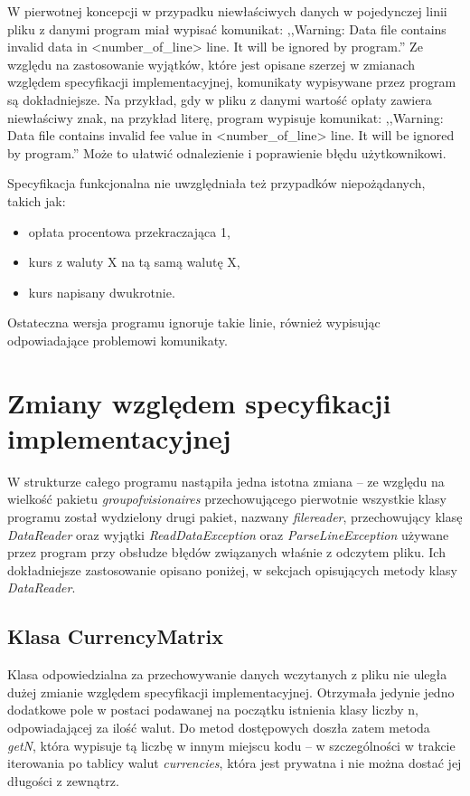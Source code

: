 \documentclass[a4paper,12pt]{article}
\newcommand\tab[1][0.6cm]{\hspace*{#1}}
\begin{document}
\tab W pierwotnej koncepcji w przypadku niewłaściwych danych w pojedynczej linii pliku z danymi program miał wypisać komunikat: ,,Warning: Data file contains invalid data in <number\_of\_line> line. It will be ignored by program.'' Ze względu na zastosowanie wyjątków, które jest opisane szerzej w zmianach względem specyfikacji implementacyjnej, komunikaty wypisywane przez program są dokładniejsze. Na przykład, gdy w pliku z danymi wartość opłaty zawiera niewłaściwy znak, na przykład literę, program wypisuje komunikat: ,,Warning: Data file contains invalid fee value in <number\_of\_line> line. It will be ignored by program.'' Może to ułatwić odnalezienie i poprawienie błędu użytkownikowi.

Specyfikacja funkcjonalna nie uwzględniała też przypadków niepożądanych, takich jak:
\begin {itemize}
\item opłata procentowa przekraczająca 1,
\item kurs z waluty X na tą samą walutę X,
\item kurs napisany dwukrotnie.
\end {itemize}

Ostateczna wersja programu ignoruje takie linie, również wypisując odpowiadające problemowi komunikaty.

\newpage

\section{Zmiany względem specyfikacji implementacyjnej}

\tab W strukturze całego programu nastąpiła jedna istotna zmiana -- ze względu na wielkość pakietu \textit{groupofvisionaires} przechowującego pierwotnie wszystkie klasy programu został wydzielony drugi pakiet, nazwany \textit{filereader}, przechowujący klasę \textit{DataReader} oraz wyjątki \textit{ReadDataException} oraz \textit{ParseLineException} używane przez program przy obsłudze błędów związanych właśnie z odczytem pliku. Ich dokładniejsze zastosowanie opisano poniżej, w sekcjach opisujących metody klasy \textit{DataReader}.

\subsection{Klasa CurrencyMatrix}

\tab Klasa odpowiedzialna za przechowywanie danych wczytanych z pliku nie uległa dużej zmianie względem specyfikacji implementacyjnej. Otrzymała jedynie jedno dodatkowe pole w postaci podawanej na początku istnienia klasy liczby n, odpowiadającej za ilość walut. Do metod dostępowych doszła zatem metoda \textit{getN}, która wypisuje tą liczbę w innym miejscu kodu -- w szczególności w trakcie iterowania po tablicy walut \textit{currencies}, która jest prywatna i nie można dostać jej długości z zewnątrz.
\end{document}
